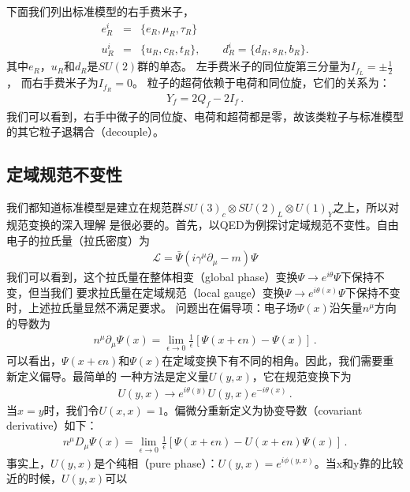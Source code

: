 下面我们列出标准模型的右手费米子，
\begin{eqnarray}
e_R^i &=& \{e_R, \mu_R, \tau_R\}
\nonumber \\
u_R^i &=& \{u_R, c_R, t_R \}, \qquad d_R^i = \{d_R, s_R, b_R\} .
\end{eqnarray}
其中$e_R$，$u_R$和$d_R$是$SU(2)$群的单态。
左手费米子的同位旋第三分量为$I_{f_L} = \pm \frac{1}{2}$， 而右手费米子为$I_{f_R} = 0$。
粒子的超荷依赖于电荷和同位旋，它们的关系为：
\begin{eqnarray}
Y_f = 2Q_f - 2I_f \, .
\label{eqn:hyperchargeDef}
\end{eqnarray}
我们可以看到，右手中微子的同位旋、电荷和超荷都是零，故该类粒子与标准模型的其它粒子退耦合（decouple）。

\subsection{定域规范不变性}
我们都知道标准模型是建立在规范群$SU(3)_c \otimes SU(2)_L \otimes U(1)_Y$之上，所以对规范变换的深入理解
是很必要的。首先，以QED为例探讨定域规范不变性。自由电子的拉氏量（拉氏密度）为
\begin{eqnarray}
\mathscr{L} = \bar{\Psi} (i\gamma^{\mu}\partial_{\mu} - m)\Psi
\label{eqn:freeElectronL}
\end{eqnarray}
我们可以看到，这个拉氏量在整体相变（global phase）变换$\Psi \to e^{i\theta}\Psi$下保持不变，但当我们
要求拉氏量在定域规范（local gauge）变换$\Psi \to e^{i\theta(x)}\Psi$下保持不变时，上述拉氏量显然不满足要求。
问题出在偏导项：电子场$\Psi(x)$沿矢量$n^{\mu}$方向的导数为
\begin{eqnarray}
n^{\mu}\partial_{\mu} \Psi(x) = \lim_{\epsilon\to 0}\frac{1}{\epsilon}[\Psi(x+\epsilon n) - \Psi(x)] \, .
\end{eqnarray}
可以看出，$\Psi(x+\epsilon n)$和$\Psi(x)$在定域变换下有不同的相角。因此，我们需要重新定义偏导。最简单的
一种方法是定义量$U(y, x)$，它在规范变换下为
\begin{eqnarray}
U(y,x) \to e^{i\theta(y)}U(y,x)e^{-i\theta(x)} \, .
\label{eqn:UyxGaugeTranse}
\end{eqnarray}
当$x=y$时，我们令$U(x,x) = 1$。偏微分重新定义为协变导数（covariant derivative）如下：
\begin{eqnarray}
n^{\mu} D_{\mu}\Psi(x) = \lim_{\epsilon \to 0}\frac{1}{\epsilon}[\Psi(x+\epsilon n) - U(x+\epsilon n)\Psi(x)]\, .
\label{eqn:coviarant}
\end{eqnarray}
事实上，$U(y,x)$是个纯相（pure phase）：$U(y,x) = e^{i\phi(y,x)}$。当x和y靠的比较近的时候，$U(y,x)$可以
